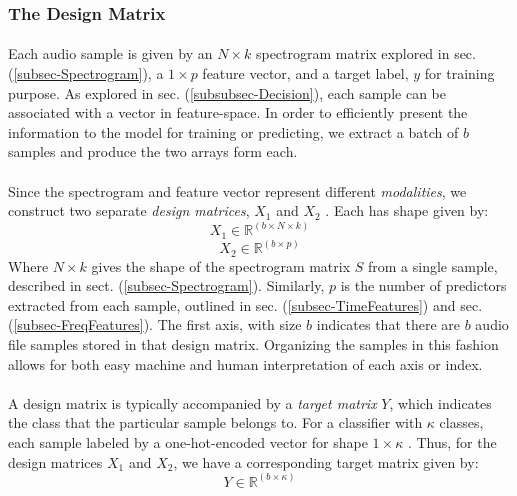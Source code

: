 \documentclass[12pt,letterpaper]{article}
\begin{document}

\subsubsection{The Design Matrix}
\label{subsubsec-DesignMatrix}

\paragraph*{}Each audio sample is given by an $N \times k$ spectrogram matrix explored in sec. (\ref{subsec-Spectrogram}), a $1 \times p$ feature vector, and a target label, $y$ for training purpose. As explored in sec. (\ref{subsubsec-Decision}), each sample can be associated with a vector in feature-space. In order to efficiently present the information to the model for training or predicting, we extract a batch of $b$ samples and produce the two arrays form each.

\paragraph*{}Since the spectrogram and feature vector represent different \textit{modalities}, we construct two separate \textit{design matrices}, $X_1$ and $X_2$ \cite{Geron,Li,Ngiam}. Each has shape given by:
\begin{equation}
\label{eqn-X1Shape}
X_1 \in \mathbb{R}^{(b \times N \times k)}
\end{equation}
\begin{equation}
\label{eqn-X2Shape}
X_2 \in \mathbb{R}^{(b \times p)}
\end{equation}
Where $N \times k$ gives the shape of the spectrogram matrix $S$ from a single sample, described in sect. (\ref{subsec-Spectrogram}). Similarly, $p$ is the number of predictors extracted from each sample, outlined in sec. (\ref{subsec-TimeFeatures}) and sec.(\ref{subsec-FreqFeatures}). The first axis, with size $b$ indicates that there are $b$ audio file samples stored in that design matrix. Organizing the samples in this fashion allows for both easy machine and human interpretation of each axis or index.

\paragraph*{}A design matrix is typically accompanied by a \textit{target matrix} $Y$, which indicates the class that the particular sample belongs to. For a classifier with $\kappa$ classes, each sample labeled by a one-hot-encoded vector for shape $1 \times \kappa$ \cite{Tensorflow,Loy}. Thus, for the design matrices $X_1$ and $X_2$, we have a corresponding target matrix given by:
\begin{equation}
\label{eqn-YShape}
Y \in \mathbb{R}^{(b \times \kappa)}
\end{equation}
\end{document}
